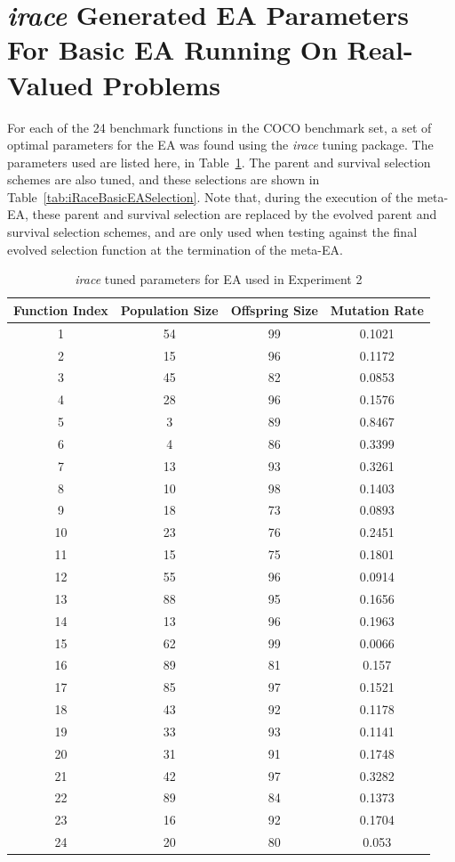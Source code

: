 \documentclass[sigconf]{acmart}
\begin{document}
\section{\textit{irace} Generated EA Parameters For Basic EA Running On Real-Valued Problems}
\label{apx:iRaceBasicEACOCOParams}

For each of the 24 benchmark functions in the COCO benchmark set, a set of optimal parameters for the EA was found using the \textit{irace} tuning package. The parameters used are listed here, in Table~\ref{tab:iRaceBasicEAParams}. The parent and survival selection schemes are also tuned, and these selections are shown in Table~\ref{tab:iRaceBasicEASelection}. Note that, during the execution of the meta-EA, these parent and survival selection are replaced by the evolved parent and survival selection schemes, and are only used when testing against the final evolved selection function at the termination of the meta-EA. 

\begin{table}
	\centering
	\caption{\textit{irace} tuned parameters for EA used in Experiment 2}
	\label{tab:iRaceBasicEAParams}
	\begin{tabular}{cccc}
		\toprule
		Function Index & Population Size & Offspring Size & Mutation Rate\\
		\midrule
		1 & 54 & 99 & 0.1021\\
		\hline
		2 & 15 & 96 & 0.1172\\
		\hline
		3 & 45 & 82 & 0.0853\\
		\hline
		4 & 28 & 96 & 0.1576\\
		\hline
		5 & 3 & 89 & 0.8467\\
		\hline
		6 & 4 & 86 & 0.3399\\
		\hline
		7 & 13 & 93 & 0.3261\\
		\hline
		8 & 10 & 98 & 0.1403\\
		\hline
		9 & 18 & 73 & 0.0893\\
		\hline
		10 & 23 & 76 & 0.2451\\
		\hline
		11 & 15 & 75 & 0.1801\\
		\hline
		12 & 55 & 96 & 0.0914\\
		\hline
		13 & 88 & 95 & 0.1656\\
		\hline
		14 & 13 & 96 & 0.1963\\
		\hline
		15 & 62 & 99 & 0.0066\\
		\hline
		16 & 89 & 81 & 0.157\\
		\hline
		17 & 85 & 97 & 0.1521\\
		\hline
		18 & 43 & 92 & 0.1178\\
		\hline
		19 & 33 & 93 & 0.1141\\
		\hline
		20 & 31 & 91 & 0.1748\\
		\hline
		21 & 42 & 97 & 0.3282\\
		\hline
		22 & 89 & 84 & 0.1373\\
		\hline
		23 & 16 & 92 & 0.1704\\
		\hline
		24 & 20 & 80 & 0.053\\              
		
		\bottomrule
	\end{tabular}
\end{table}
\end{document}
